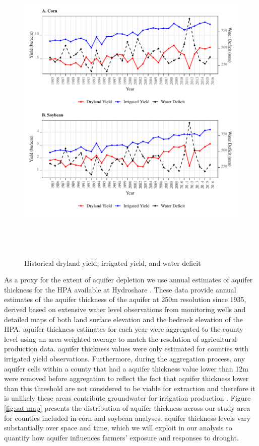 \documentclass[
]{article}
\begin{document}
\begin{figure}[H]

{\centering \includegraphics[width=750px,height=6in,]{Figures/g_y_wd_all} 

}

\caption{Historical dryland yield, irrigated yield, and water deficit}\label{fig:deficit-yield-hist}
\end{figure}

As a proxy for the extent of aquifer depletion we use annual estimates of aquifer thickness for the HPA available at Hydroshare \citep{haacker2023}. These data provide annual estimates of the aquifer thickness of the aquifer at 250m resolution since 1935, derived based on extensive water level observations from monitoring wells and detailed maps of both land surface elevation and the bedrock elevation of the HPA. aquifer thickness estimates for each year were aggregated to the county level using an area-weighted average to match the resolution of agricultural production data. aquifer thickness values were only estimated for counties with irrigated yield observations. Furthermore, during the aggregation process, any aquifer cells within a county that had a aquifer thickness value lower than 12m were removed before aggregation to reflect the fact that aquifer thickness lower than this threshold are not considered to be viable for extraction and therefore it is unlikely these areas contribute groundwater for irrigation production \citep{fenichel2016measuring, haacker2016water, deines2020transitions}. Figure \ref{fig:sat-map} presents the distribution of aquifer thickness across our study area for counties included in corn and soybean analyses. aquifer thickness levels vary substantially over space and time, which we will exploit in our analysis to quantify how aquifer influences farmers' exposure and responses to drought.
\end{document}
